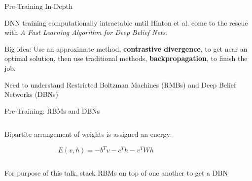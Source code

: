 \documentclass[notes]{beamer}
\begin{document}
\begin{frame}{Pre-Training In-Depth}
	\vfill

	\begin{center}
		DNN training computationally intractable until Hinton et al. come to the rescue with \textit{A Fast Learning Algorithm for Deep Belief Nets}.
	\end{center}
	
	\vfill

	\begin{center}
		Big idea: Use an approximate method, \textbf{contrastive divergence}, to get near an optimal solution, then use traditional methods, \textbf{backpropagation}, to finish the job. 
	\end{center}
	
	\vfill
	
	\begin{center}
		Need to understand Restricted Boltzman Machines (RMBs) and Deep Belief Networks (DBNs)
	\end{center}
	
	\vfill
\end{frame}

\begin{frame}{Pre-Training: RBMs and DBNs}
	\vfill

	\begin{columns}
		\begin{column}{0.4\linewidth}
			\begin{center}
				Bipartite arrangement of weights is assigned an energy:
			\end{center}
		
			\begin{equation*}	
				E(v, h) = - b^T v - c^T h - v^T W h
			\end{equation*}
		\end{column}
		\begin{column}{0.6\linewidth}
		\end{column}
	\end{columns}
	
	\vfill

	\begin{center}
		For purpose of this talk, stack RBMs on top of one another to get a DBN
	\end{center}

	\vfill
\end{frame}
\end{document}
